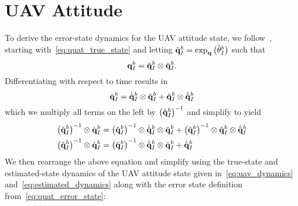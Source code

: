 \section{UAV Attitude}
To derive the error-state dynamics for the UAV attitude state, we
follow~\cite{koch2017relative}, starting
with~\eqref{eq:quat_true_state} and letting $\tilde{\mathrm{\mathbf{q}}}_I^b = \exp_{\mathrm{\mathbf{q}}} \left(
  \tilde{\mathrm{\mathbf{\theta}}}_I^b \right)$ such that
\begin{equation}
  \mathrm{\mathbf{q}}_I^b  = \hat{\mathrm{\mathbf{q}}}_I^b \otimes \tilde{\mathrm{\mathbf{q}}}_I^b.
\end{equation}
Differentiating with respect to time results in
\begin{equation}
  \dot{\mathrm{\mathbf{q}}}_I^b  = \dot{\hat{\mathrm{\mathbf{q}}}}_I^b \otimes \tilde{\mathrm{\mathbf{q}}}_I^b + 
  \hat{\mathrm{\mathbf{q}}}_I^b \otimes \dot{\tilde{\mathrm{\mathbf{q}}}}_I^b
\end{equation}
which we multiply all terms on the left by $\left( \hat{\mathrm{\mathbf{q}}}_I^b \right)^{-1}$
and simplify to yield
\begin{align}
  \left( \hat{\mathrm{\mathbf{q}}}_I^b \right)^{-1} \otimes \dot{\mathrm{\mathbf{q}}}_I^b  &= \left( \hat{\mathrm{\mathbf{q}}}_I^b
  \right)^{-1} \otimes \dot{\hat{\mathrm{\mathbf{q}}}}_I^b \otimes \tilde{\mathrm{\mathbf{q}}}_I^b + 
  \left( \hat{\mathrm{\mathbf{q}}}_I^b \right)^{-1} \otimes \hat{\mathrm{\mathbf{q}}}_I^b \otimes \dot{\tilde{\mathrm{\mathbf{q}}}}_I^b
  \\
  \left( \hat{\mathrm{\mathbf{q}}}_I^b \right)^{-1} \otimes \dot{\mathrm{\mathbf{q}}}_I^b  &= \left( \hat{\mathrm{\mathbf{q}}}_I^b
  \right)^{-1} \otimes \dot{\hat{\mathrm{\mathbf{q}}}}_I^b \otimes \tilde{\mathrm{\mathbf{q}}}_I^b + 
  \dot{\tilde{\mathrm{\mathbf{q}}}}_I^b
\end{align}
We then rearrange the above equation and simplify using the true-state and
estimated-state dynamics of the UAV attitude state given
in~\eqref{eq:uav_dynamics} and~\eqref{eq:estimated_dynamics} along with the
error state definition from~\eqref{eq:quat_error_state}:
